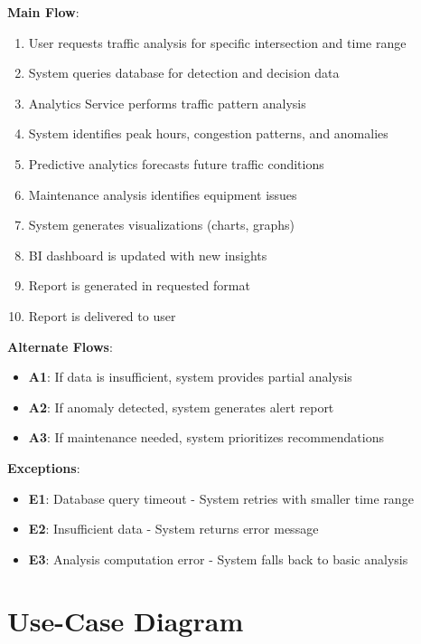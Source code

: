 \documentclass[12pt,a4paper]{article}
\begin{document}
\textbf{Main Flow}:
\begin{enumerate}
    \item User requests traffic analysis for specific intersection and time range
    \item System queries database for detection and decision data
    \item Analytics Service performs traffic pattern analysis
    \item System identifies peak hours, congestion patterns, and anomalies
    \item Predictive analytics forecasts future traffic conditions
    \item Maintenance analysis identifies equipment issues
    \item System generates visualizations (charts, graphs)
    \item BI dashboard is updated with new insights
    \item Report is generated in requested format
    \item Report is delivered to user
\end{enumerate}

\textbf{Alternate Flows}:
\begin{itemize}
    \item \textbf{A1}: If data is insufficient, system provides partial analysis
    \item \textbf{A2}: If anomaly detected, system generates alert report
    \item \textbf{A3}: If maintenance needed, system prioritizes recommendations
\end{itemize}

\textbf{Exceptions}:
\begin{itemize}
    \item \textbf{E1}: Database query timeout - System retries with smaller time range
    \item \textbf{E2}: Insufficient data - System returns error message
    \item \textbf{E3}: Analysis computation error - System falls back to basic analysis
\end{itemize}

\section{Use-Case Diagram}
\end{document}

